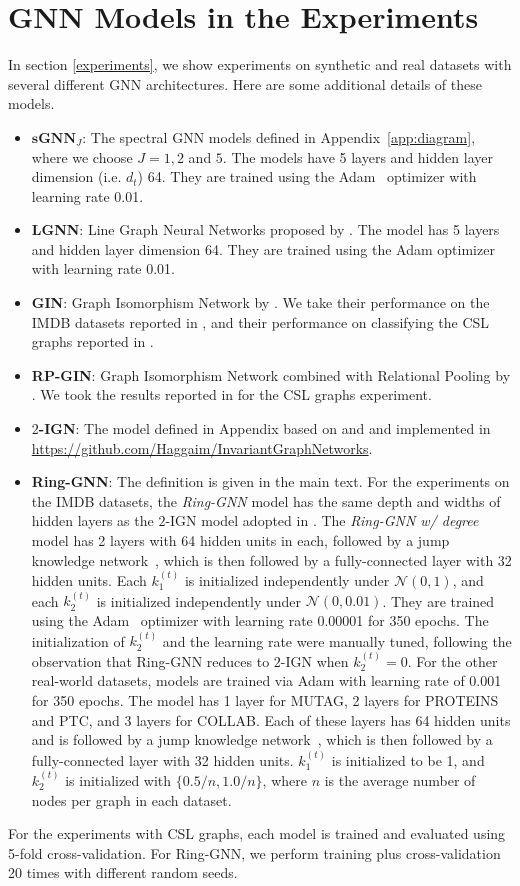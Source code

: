 \documentclass{article}
\begin{document}
\section{GNN Models in the Experiments}
\label{archi}
In section \ref{experiments}, we show experiments on synthetic and real datasets with several different GNN architectures. Here are some additional details of these models.
\begin{itemize}
\item $\textbf{sGNN}_J$: The spectral GNN models defined in Appendix~\ref{app:diagram}, where we choose $J = 1, 2$ and $5$.
The models have 5 layers and hidden layer dimension (i.e. $d_t$) 64. They are trained using the Adam~\cite{kingma2014adam} optimizer with learning rate 0.01.
\item \textbf{LGNN}: Line Graph Neural Networks proposed by \cite{chen2019cdsbm}. The model has 5 layers and hidden layer dimension 64. They are trained using the Adam optimizer with learning rate 0.01.
\item \textbf{GIN}: Graph Isomorphism Network by \cite{xu2018powerful}. We take their performance on the IMDB datasets reported in \cite{xu2018powerful}, and their performance on classifying the CSL graphs reported in \cite{murphy2019relational} .
\item \textbf{RP-GIN}: Graph Isomorphism Network combined with Relational Pooling by \cite{murphy2019relational}. We took the results reported in \cite{murphy2019relational} for the CSL graphs experiment.
\item \textbf{$2$-IGN}: The model defined in Appendix based on \cite{maron2018invariant} and \cite{maron2019universality} and implemented in \url{https://github.com/Haggaim/InvariantGraphNetworks}.
\item \textbf{Ring-GNN}: The definition is given in the main text. For the experiments on the IMDB datasets, the \emph{Ring-GNN} model has the same depth and widths of hidden layers as the $2$-IGN model adopted in \cite{maron2018invariant}. The \emph{Ring-GNN w/ degree} model has 2 layers with 64 hidden units in each, followed by a jump knowledge network~\cite{xu2018representation}, which is then followed by a fully-connected layer with 32 hidden units. Each $k_1^{(t)}$ is initialized independently under $\mathcal{N}(0,1)$, and each $k_2^{(t)}$ is initialized independently under $\mathcal{N}(0,0.01)$. They are trained using the Adam~\cite{kingma2014adam} optimizer with learning rate 0.00001 for 350 epochs. The initialization of $k_2^{(t)}$ and the learning rate were manually tuned, following the observation that Ring-GNN reduces to $2$-IGN when $k_2^{(t)}=0$.
For the other real-world datasets, models are trained via Adam with learning rate of 0.001 for 350 epochs. The model has 1 layer for MUTAG, 2 layers for PROTEINS and PTC, and 3 layers for COLLAB. Each of these layers has 64 hidden units and is followed by a jump knowledge network~\cite{xu2018representation}, which is then followed by a fully-connected layer with 32 hidden units. $k_1^{(t)}$ is initialized to be 1, and $k_2^{(t)}$ is initialized with $\{0.5/n, 1.0/n\}$, where $n$ is the average number of nodes per graph in each dataset.
\end{itemize}

For the experiments with CSL graphs, each model is trained and evaluated using 5-fold cross-validation. For Ring-GNN, we perform training plus cross-validation 20 times with different random seeds.
\end{document}
